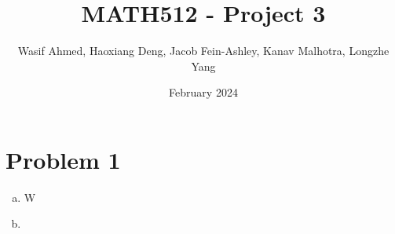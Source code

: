 \documentclass{article}
\title{MATH512 - Project 3}
\author{Wasif Ahmed, Haoxiang Deng, Jacob Fein-Ashley, Kanav Malhotra, Longzhe Yang}
\date{February 2024}
\begin{document}
\maketitle

\section*{Problem 1}

\begin{enumerate}[(a)]
    \item 
        W
    \item
\end{enumerate}
\end{document}
